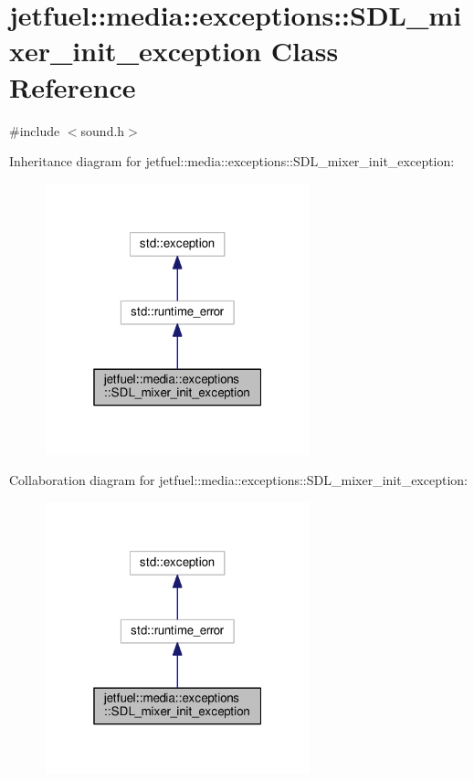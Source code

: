\hypertarget{classjetfuel_1_1media_1_1exceptions_1_1SDL__mixer__init__exception}{}\section{jetfuel\+:\+:media\+:\+:exceptions\+:\+:S\+D\+L\+\_\+mixer\+\_\+init\+\_\+exception Class Reference}
\label{classjetfuel_1_1media_1_1exceptions_1_1SDL__mixer__init__exception}


{\ttfamily \#include $<$sound.\+h$>$}



Inheritance diagram for jetfuel\+:\+:media\+:\+:exceptions\+:\+:S\+D\+L\+\_\+mixer\+\_\+init\+\_\+exception\+:\nopagebreak
\begin{figure}[H]
\begin{center}
\leavevmode
\includegraphics[width=217pt]{classjetfuel_1_1media_1_1exceptions_1_1SDL__mixer__init__exception__inherit__graph}
\end{center}
\end{figure}


Collaboration diagram for jetfuel\+:\+:media\+:\+:exceptions\+:\+:S\+D\+L\+\_\+mixer\+\_\+init\+\_\+exception\+:\nopagebreak
\begin{figure}[H]
\begin{center}
\leavevmode
\includegraphics[width=217pt]{classjetfuel_1_1media_1_1exceptions_1_1SDL__mixer__init__exception__coll__graph}
\end{center}
\end{figure}
